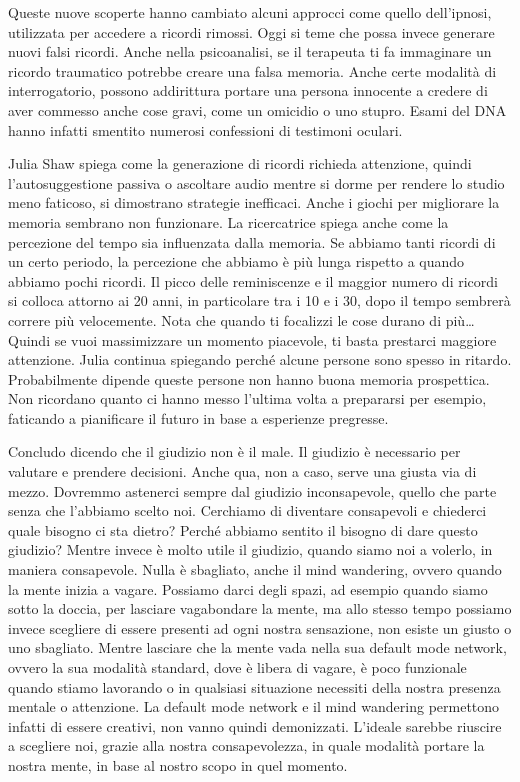 \documentclass[12pt]{book} %
\begin{document}
\begin{mdframed}[linewidth=1pt]
Queste nuove scoperte hanno cambiato alcuni approcci come quello dell'ipnosi, utilizzata per accedere a ricordi rimossi.
Oggi si teme che possa invece generare nuovi falsi ricordi. 
Anche nella psicoanalisi, se il terapeuta ti fa immaginare un ricordo traumatico potrebbe creare una
falsa memoria. Anche certe modalità di interrogatorio, possono addirittura portare una persona innocente a credere di
aver commesso anche cose gravi, come un omicidio o uno stupro. Esami del DNA hanno infatti smentito numerosi confessioni di testimoni oculari.

Julia Shaw spiega come la generazione di ricordi richieda attenzione, quindi l'autosuggestione
passiva o ascoltare audio mentre si dorme per rendere lo studio meno faticoso, si dimostrano strategie inefficaci.
Anche i giochi per migliorare la memoria sembrano non funzionare. La ricercatrice spiega anche come la percezione del
tempo sia influenzata dalla memoria. Se abbiamo tanti ricordi di un certo periodo, la percezione che abbiamo è più
lunga rispetto a quando abbiamo pochi ricordi. Il picco delle reminiscenze e il maggior numero di ricordi si colloca
attorno ai 20 anni, in particolare tra i 10 e i 30, dopo il tempo sembrerà correre più velocemente. 
Nota che quando ti focalizzi le cose durano di più… Quindi se vuoi massimizzare un momento piacevole, ti basta prestarci maggiore attenzione.
Julia continua spiegando perché alcune persone sono spesso in ritardo. Probabilmente dipende queste persone non hanno buona memoria prospettica.
Non ricordano quanto ci hanno messo l'ultima volta a prepararsi per esempio, faticando a pianificare il futuro in base a esperienze pregresse.
\end{mdframed}

Concludo dicendo che il giudizio non è il male. Il giudizio è necessario per valutare e prendere decisioni. Anche qua,
non a caso, serve una giusta via di mezzo. Dovremmo astenerci sempre dal giudizio inconsapevole, quello che parte senza
che l'abbiamo scelto noi. Cerchiamo di diventare consapevoli e chiederci quale bisogno ci sta dietro?
Perché abbiamo sentito il bisogno di dare questo giudizio? Mentre invece è molto utile il giudizio, quando siamo noi a
volerlo, in maniera consapevole.
Nulla è sbagliato, anche il mind wandering, ovvero quando la mente inizia a vagare. Possiamo darci degli spazi, ad
esempio quando siamo sotto la doccia, per lasciare vagabondare la mente, ma allo stesso tempo possiamo invece scegliere
di essere presenti ad ogni nostra sensazione, non esiste un giusto o uno sbagliato. Mentre lasciare che la mente vada
nella sua default mode network, ovvero la sua modalità standard, dove è libera di vagare, è poco funzionale quando
stiamo lavorando o in qualsiasi situazione necessiti della nostra presenza mentale o attenzione. 
La default mode network e il mind wandering permettono infatti di essere creativi, non vanno quindi
demonizzati.
L'ideale sarebbe riuscire a scegliere noi, grazie alla nostra consapevolezza, in quale modalità
portare la nostra mente, in base al nostro scopo in quel momento.
\end{document}
